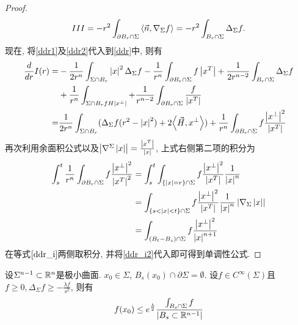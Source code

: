 \begin{proof}
\begin{equation}
        III=-r^2\int_{\partial B_r\cap \Sigma} {\left < \vec{n}, \nabla_\Sigma f \right >} =-r^2\int_{{B_r} \cap \Sigma} \Delta_{\Sigma}f.
     \end{equation}
     现在, 将\eqref{ddr1}及\eqref{ddr2}代入到\eqref{ddr}中, 则有
     \begin{equation}\label{ddr_i}
        \begin{split}
            \frac{d}{dr} I(r) =& -\frac{1}{2r^n}\int_{\Sigma \cap B_r}\left | x \right |^2 \Delta_\Sigma f - \frac{1}{r^n} \int_{\partial B_r\cap \Sigma} f \left | x^T \right | + \frac{1}{2r^{n-2}} \int_{B_r\cap \Sigma} \Delta_\Sigma f \\
            &+ \frac{1}{r^n} \int_{\Sigma \cap B_r fH\left | x^\perp \right |} + \frac{1}{r^{n-2}} \int_{\partial B_r \cap \Sigma} \frac{f}{\left | x^T \right |} \\
            =& \frac{1}{2r^n} \int_{\Sigma \cap B_r}(\Delta_\Sigma f(r^2-\left | x \right |^2) + 2{\left < \vec{H}, x^\perp \right >}) + \frac{1}{r^n}\int_{\partial B_r\cap \Sigma} f \frac{\left | x^\perp \right |^2}{\left | x^T \right |}
        \end{split}
     \end{equation}
     再次利用余面积公式以及$\left | \nabla^\Sigma\left | x \right | \right |=\frac{\left | x^T \right |}{\left | x \right |}$, 上式右侧第二项的积分为
     \begin{equation} \label{ddr_i2}
        \begin{split}
            \int^t_s \frac{1}{r^n} \int_{\partial B_r \cap \Sigma} f \frac{\left | x^\perp \right |^2}{\left | x^T \right |^2} &= \int^t_s \int_{\{\left | x \right | = r\}\cap \Sigma} f  \frac{\left | x^\perp \right |^2}{\left | x^T \right |} \frac{1}{\left | x \right |^n} \\
            &= \int_{\{s<\left | x \right |<t\}\cap \Sigma } f \frac{\left | x^\perp \right |^2}{\left | x^T \right |}\frac{1}{\left | x \right |^n}\left | \nabla_\Sigma\left | x \right | \right | \\
            &=\int_{(B_t-B_s)\cap \Sigma} f \frac{\left | x^\perp \right |^2}{\left | x \right |^{n+1}}
        \end{split}
     \end{equation}
     在等式$\eqref{ddr_i}$两侧取积分, 并将\eqref{ddr_i2}代入即可得到单调性公式.
\end{proof}
\begin{corollary} \label{sub_harmonic}
    设$\Sigma^{n-1} \subset \mathbb{R}^n$是极小曲面. $x_0 \in \Sigma$, $B_s(x_0) \cap \partial \Sigma = \emptyset$. 设$f \in C^\infty(\Sigma)$且 $f \ge 0, \Delta_{\Sigma}f \ge -\frac{\lambda f}{s^2}$, 则有
    \begin{equation}
        f(x_0) \le e^{\frac{\lambda}{2}}\frac{\int_{B_s\cap \Sigma}f}{\left | B_s\subset \mathbb{R}^{n-1} \right |}
    \end{equation}
\end{corollary}
